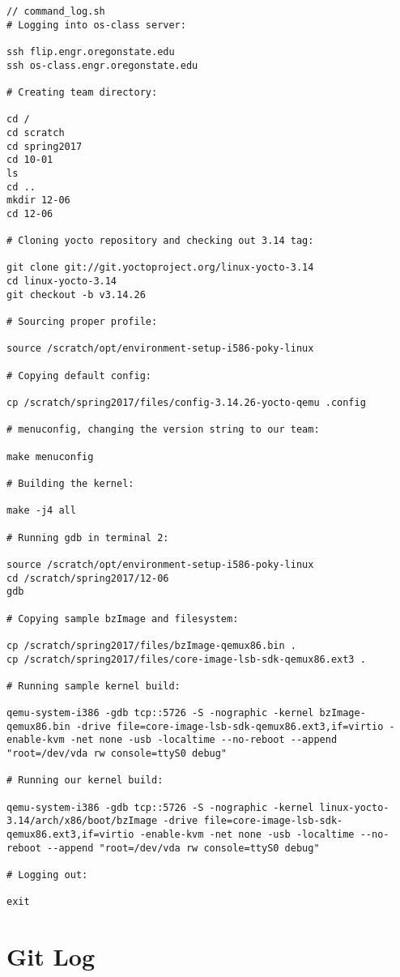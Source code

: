 \documentclass[10pt,onecolumn,journal,draftclsnofoot]{IEEEtran}
\begin{document}
\begin{lstlisting}
// command_log.sh
# Logging into os-class server:

ssh flip.engr.oregonstate.edu
ssh os-class.engr.oregonstate.edu

# Creating team directory:

cd /
cd scratch
cd spring2017
cd 10-01
ls
cd ..
mkdir 12-06
cd 12-06

# Cloning yocto repository and checking out 3.14 tag:

git clone git://git.yoctoproject.org/linux-yocto-3.14
cd linux-yocto-3.14
git checkout -b v3.14.26

# Sourcing proper profile:

source /scratch/opt/environment-setup-i586-poky-linux

# Copying default config:

cp /scratch/spring2017/files/config-3.14.26-yocto-qemu .config

# menuconfig, changing the version string to our team:

make menuconfig

# Building the kernel:

make -j4 all

# Running gdb in terminal 2:

source /scratch/opt/environment-setup-i586-poky-linux
cd /scratch/spring2017/12-06
gdb

# Copying sample bzImage and filesystem:

cp /scratch/spring2017/files/bzImage-qemux86.bin .
cp /scratch/spring2017/files/core-image-lsb-sdk-qemux86.ext3 .

# Running sample kernel build:

qemu-system-i386 -gdb tcp::5726 -S -nographic -kernel bzImage-qemux86.bin -drive file=core-image-lsb-sdk-qemux86.ext3,if=virtio -enable-kvm -net none -usb -localtime --no-reboot --append "root=/dev/vda rw console=ttyS0 debug"

# Running our kernel build:

qemu-system-i386 -gdb tcp::5726 -S -nographic -kernel linux-yocto-3.14/arch/x86/boot/bzImage -drive file=core-image-lsb-sdk-qemux86.ext3,if=virtio -enable-kvm -net none -usb -localtime --no-reboot --append "root=/dev/vda rw console=ttyS0 debug"

# Logging out:

exit
\end{lstlisting}

\section{Git Log}
\end{document}

